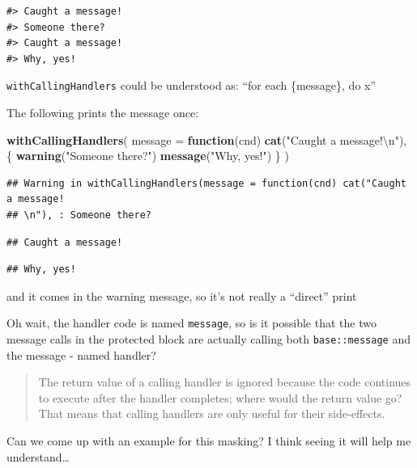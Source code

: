 \documentclass[]{book}
\newenvironment{Shaded}{\begin{snugshade}}{\end{snugshade}}
\newcommand{\CharTok}[1]{\textcolor[rgb]{0.31,0.60,0.02}{#1}}
\newcommand{\ControlFlowTok}[1]{\textcolor[rgb]{0.13,0.29,0.53}{\textbf{#1}}}
\newcommand{\DataTypeTok}[1]{\textcolor[rgb]{0.13,0.29,0.53}{#1}}
\newcommand{\KeywordTok}[1]{\textcolor[rgb]{0.13,0.29,0.53}{\textbf{#1}}}
\newcommand{\NormalTok}[1]{#1}
\newcommand{\StringTok}[1]{\textcolor[rgb]{0.31,0.60,0.02}{#1}}
\begin{document}
\begin{verbatim}
#> Caught a message!
#> Someone there?
#> Caught a message!
#> Why, yes!
\end{verbatim}

\texttt{withCallingHandlers} could be understood as: ``for each \{message\}, do x''

The following prints the message once:

\begin{Shaded}
\begin{Highlighting}[]
\KeywordTok{withCallingHandlers}\NormalTok{(}
  \DataTypeTok{message =} \ControlFlowTok{function}\NormalTok{(cnd) }\KeywordTok{cat}\NormalTok{(}\StringTok{"Caught a message!}\CharTok{\textbackslash{}n}\StringTok{"}\NormalTok{), }
\NormalTok{  \{}
    \KeywordTok{warning}\NormalTok{(}\StringTok{"Someone there?"}\NormalTok{)}
    \KeywordTok{message}\NormalTok{(}\StringTok{"Why, yes!"}\NormalTok{)}
\NormalTok{  \}}
\NormalTok{)}
\end{Highlighting}
\end{Shaded}

\begin{verbatim}
## Warning in withCallingHandlers(message = function(cnd) cat("Caught a message!
## \n"), : Someone there?
\end{verbatim}

\begin{verbatim}
## Caught a message!
\end{verbatim}

\begin{verbatim}
## Why, yes!
\end{verbatim}

and it comes in the warning message, so it's not really a ``direct'' print

Oh wait, the handler code is named \texttt{message}, so is it possible that the two message calls in the protected block are actually calling both \texttt{base::message} and the message - named handler?

\begin{quote}
The return value of a calling handler is ignored because the code continues to execute after the handler completes; where would the return value go? That means that calling handlers are only useful for their side-effects.
\end{quote}

Can we come up with an example for this masking? I think seeing it will help me understand\ldots{}
\end{document}
